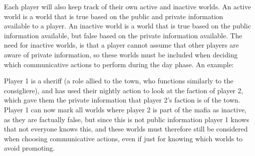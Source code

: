Each player will also keep track of their own active and inactive worlds.
An active world is a world that is true based on the public and private
information available to a player. An inactive world is a world that is true
based on the public information available, but false based on the private
information available. The need for inactive worlds, is that a player cannot
assume that other players are aware of private information, so these worlds
must be included when deciding which communicative actions to perform during
the day phase. An example:

Player 1 is a sheriff (a role allied to the town, who functions similarly to
the consigliere), and has used their nightly action to look at the faction of
player 2, which gave them the private information that player 2's faction is of
the town. Player 1 can now mark all worlds where player 2 is part of the mafia
as inactive, as they are factually false, but since this is not public
information player 1 knows that not everyone knows this, and these worlds must
therefore still be considered when choosing communicative actions, even if just
for knowing which worlds to avoid promoting.
